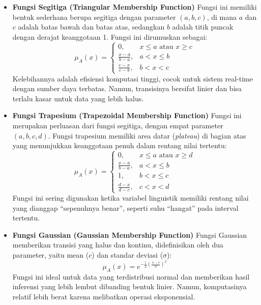 \documentclass[12pt,a4paper]{article}
\theoremstyle{remark}
\begin{document}
\begin{itemize}
    \item \textbf{Fungsi Segitiga (Triangular Membership Function)}
          Fungsi ini memiliki bentuk sederhana berupa segitiga dengan parameter \((a,b,c)\), di mana \(a\) dan \(c\) adalah batas bawah dan batas atas, sedangkan \(b\) adalah titik puncak dengan derajat keanggotaan 1. Fungsi ini dirumuskan sebagai:
          \[
              \mu_A(x) =
              \begin{cases}
                  0,               & x \leq a \text{ atau } x \geq c \\
                  \frac{x-a}{b-a}, & a < x \leq b                    \\
                  \frac{c-x}{c-b}, & b < x < c
              \end{cases}
          \]
          Kelebihannya adalah efisiensi komputasi tinggi, cocok untuk sistem real-time dengan sumber daya terbatas. Namun, transisinya bersifat linier dan bisa terlalu kasar untuk data yang lebih halus.

    \item \textbf{Fungsi Trapesium (Trapezoidal Membership Function)}
          Fungsi ini merupakan perluasan dari fungsi segitiga, dengan empat parameter \((a,b,c,d)\). Fungsi trapesium memiliki area datar (\textit{plateau}) di bagian atas yang menunjukkan keanggotaan penuh dalam rentang nilai tertentu:
          \[
              \mu_A(x) =
              \begin{cases}
                  0,               & x \leq a \text{ atau } x \geq d \\
                  \frac{x-a}{b-a}, & a < x \leq b                    \\
                  1,               & b < x \leq c                    \\
                  \frac{d-x}{d-c}, & c < x < d
              \end{cases}
          \]
          Fungsi ini sering digunakan ketika variabel linguistik memiliki rentang nilai yang dianggap “sepenuhnya benar”, seperti suhu “hangat” pada interval tertentu.

    \item \textbf{Fungsi Gaussian (Gaussian Membership Function)}
          Fungsi Gaussian memberikan transisi yang halus dan kontinu, didefinisikan oleh dua parameter, yaitu mean (\(c\)) dan standar deviasi (\(\sigma\)):
          \[
              \mu_A(x) = e^{-\frac{1}{2}\left(\frac{x - c}{\sigma}\right)^2}
          \]
          Fungsi ini ideal untuk data yang terdistribusi normal dan memberikan hasil inferensi yang lebih lembut dibanding bentuk linier. Namun, komputasinya relatif lebih berat karena melibatkan operasi eksponensial.


\end{itemize}
\end{document}
